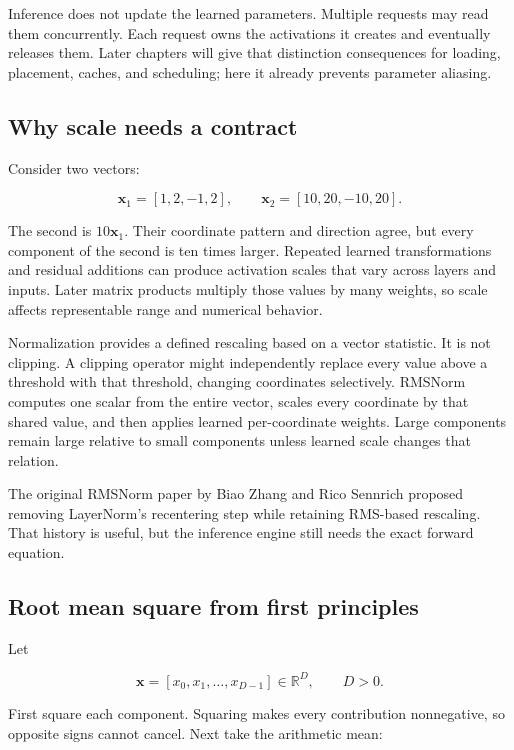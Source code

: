 \documentclass[
  10pt,
]{article}
\begin{document}
Inference does not update the learned parameters. Multiple requests may
read them concurrently. Each request owns the activations it creates and
eventually releases them. Later chapters will give that distinction
consequences for loading, placement, caches, and scheduling; here it
already prevents parameter aliasing.

\subsection{Why scale needs a
contract}\label{why-scale-needs-a-contract}

Consider two vectors:

\[
\mathbf{x}_1=[1,2,-1,2],
\qquad
\mathbf{x}_2=[10,20,-10,20].
\]

The second is \(10\mathbf{x}_1\). Their coordinate pattern and direction
agree, but every component of the second is ten times larger. Repeated
learned transformations and residual additions can produce activation
scales that vary across layers and inputs. Later matrix products
multiply those values by many weights, so scale affects representable
range and numerical behavior.

Normalization provides a defined rescaling based on a vector statistic.
It is not clipping. A clipping operator might independently replace
every value above a threshold with that threshold, changing coordinates
selectively. RMSNorm computes one scalar from the entire vector, scales
every coordinate by that shared value, and then applies learned
per-coordinate weights. Large components remain large relative to small
components unless learned scale changes that relation.

The original RMSNorm paper by Biao Zhang and Rico Sennrich proposed
removing LayerNorm's recentering step while retaining RMS-based
rescaling. That history is useful, but the inference engine still needs
the exact forward equation.

\subsection{Root mean square from first
principles}\label{root-mean-square-from-first-principles}

Let

\[
\mathbf{x}=[x_0,x_1,\ldots,x_{D-1}]\in\mathbb{R}^{D},
\qquad D>0.
\]

First square each component. Squaring makes every contribution
nonnegative, so opposite signs cannot cancel. Next take the arithmetic
mean:
\end{document}
